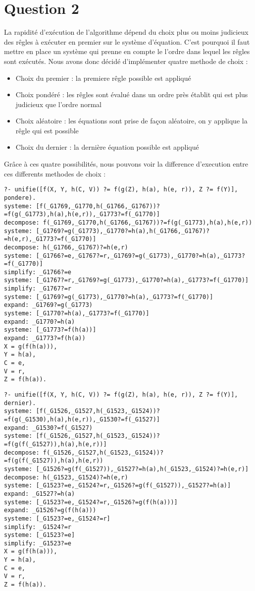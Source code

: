\documentclass[10pt,a4paper]{report}
\begin{document}
\chapter*{Question 2}
La rapidité d'exécution de l'algorithme dépend du choix plus ou moins judicieux des rêgles à exécuter en premier sur le système d'équation. C'est pourquoi il faut mettre en place un système qui prenne en compte le l'ordre dans lequel les rêgles sont exécutés.
Nous avons donc décidé d'implémenter quatre methode de choix :
\begin{itemize}
\item Choix du premier : la premiere rêgle possible est appliqué
\item Choix pondéré : les rêgles sont évalué dans un ordre près établit qui est plus judicieux que l'ordre normal
\item Choix aléatoire : les équations sont prise de façon aléatoire, on y applique la rêgle qui est possible
\item Choix du dernier : la dernière équation possible est appliqué
\end{itemize}

Grâce à ces quatre possibilités, nous pouvons voir la difference d'execution entre ces differents methodes de choix :
\begin{lstlisting}[caption ={Exemple d'execution avec le choix pondéré }]
?- unifie([f(X, Y, h(C, V)) ?= f(g(Z), h(a), h(e, r)), Z ?= f(Y)], pondere).
systeme: [f(_G1769,_G1770,h(_G1766,_G1767))?=f(g(_G1773),h(a),h(e,r)),_G1773?=f(_G1770)]
decompose: f(_G1769,_G1770,h(_G1766,_G1767))?=f(g(_G1773),h(a),h(e,r))
systeme: [_G1769?=g(_G1773),_G1770?=h(a),h(_G1766,_G1767)?=h(e,r),_G1773?=f(_G1770)]
decompose: h(_G1766,_G1767)?=h(e,r)
systeme: [_G1766?=e,_G1767?=r,_G1769?=g(_G1773),_G1770?=h(a),_G1773?=f(_G1770)]
simplify: _G1766?=e
systeme: [_G1767?=r,_G1769?=g(_G1773),_G1770?=h(a),_G1773?=f(_G1770)]
simplify: _G1767?=r
systeme: [_G1769?=g(_G1773),_G1770?=h(a),_G1773?=f(_G1770)]
expand: _G1769?=g(_G1773)
systeme: [_G1770?=h(a),_G1773?=f(_G1770)]
expand: _G1770?=h(a)
systeme: [_G1773?=f(h(a))]
expand: _G1773?=f(h(a))
X = g(f(h(a))),
Y = h(a),
C = e,
V = r,
Z = f(h(a)).

\end{lstlisting}

\begin{lstlisting}[caption ={Exemple d'execution avec le choix du dernier d'habord}]
?- unifie([f(X, Y, h(C, V)) ?= f(g(Z), h(a), h(e, r)), Z ?= f(Y)], dernier).
systeme: [f(_G1526,_G1527,h(_G1523,_G1524))?=f(g(_G1530),h(a),h(e,r)),_G1530?=f(_G1527)]
expand: _G1530?=f(_G1527)
systeme: [f(_G1526,_G1527,h(_G1523,_G1524))?=f(g(f(_G1527)),h(a),h(e,r))]
decompose: f(_G1526,_G1527,h(_G1523,_G1524))?=f(g(f(_G1527)),h(a),h(e,r))
systeme: [_G1526?=g(f(_G1527)),_G1527?=h(a),h(_G1523,_G1524)?=h(e,r)]
decompose: h(_G1523,_G1524)?=h(e,r)
systeme: [_G1523?=e,_G1524?=r,_G1526?=g(f(_G1527)),_G1527?=h(a)]
expand: _G1527?=h(a)
systeme: [_G1523?=e,_G1524?=r,_G1526?=g(f(h(a)))]
expand: _G1526?=g(f(h(a)))
systeme: [_G1523?=e,_G1524?=r]
simplify: _G1524?=r
systeme: [_G1523?=e]
simplify: _G1523?=e
X = g(f(h(a))),
Y = h(a),
C = e,
V = r,
Z = f(h(a)).

\end{lstlisting}
\end{document}
